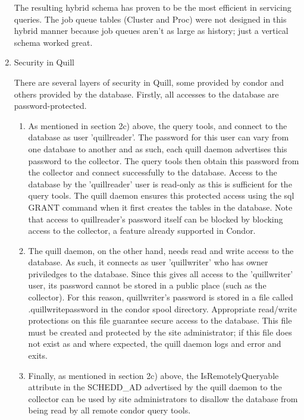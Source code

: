 \begin{enumerate}
The resulting hybrid schema has proven to be the most efficient in
servicing  queries.  The job queue tables (Cluster and
Proc) were not designed in this hybrid manner because job queues aren't
as large as history; just a vertical schema worked great.

\item Security in Quill

There are several layers of security in Quill, some provided by condor and
others provided by the database.  Firstly, all accesses to the database
are password-protected.

\begin{enumerate}
\item As mentioned in section 2c) above, the query tools, 
and  connect to the database as user 'quillreader'.
The password for this user can vary from one database to another and
as such, each quill daemon advertises this password to the collector.
The query tools then obtain this password from the collector and connect
successfully to the database.  Access to the database by the 'quillreader'
user is read-only as this is sufficient for the query tools.  The quill
daemon ensures this protected access using the sql GRANT command when
it first creates the tables in the database.  Note that access to
quillreader's password itself can be blocked by blocking access to the
collector, a feature already supported in Condor.

\item The quill daemon, on the other hand, needs read and write access
to the database.  As such, it connects as user 'quillwriter' who has
owner priviledges to the database.  Since this gives all access to the
'quillwriter' user, its password cannot be stored in a public place
(such as the collector).  For this reason, quillwriter's password is
stored in a file called .quillwritepassword in the condor spool directory.
Appropriate read/write protections on this file guarantee secure access
to the database.  This file must be created and protected by the site
administrator;  if this file does not exist as and where expected,
the quill daemon logs and error and exits.

\item Finally, as mentioned in section 2c) above, the IsRemotelyQueryable
attribute in the SCHEDD\_AD advertised by the quill daemon to the collector
can be used by site administrators to disallow the database from being
read by all remote condor query tools.


\end{enumerate}
\end{enumerate}
